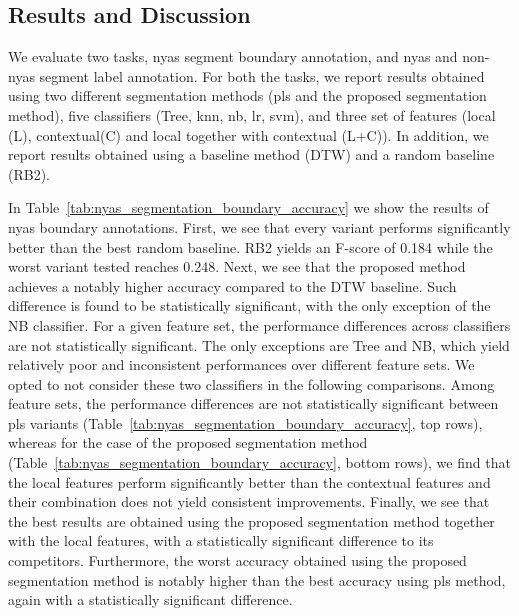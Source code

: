 {\subsection{Results and Discussion}
\label{sec:preprocessing_nyas_segmentation_results_and_discussion}

We evaluate two tasks, \gls{nyas} segment boundary annotation, and \gls{nyas} and non-\gls{nyas} segment label annotation. For both the tasks, we report results obtained using two different segmentation methods (\gls{pls} and the proposed segmentation method), five classifiers (Tree, \gls{knn}, \gls{nb}, \gls{lr}, \gls{svm}), and three set of features (local (L), contextual(C) and local together with contextual (L+C)). In addition, we report results obtained using a baseline method (DTW) and a random baseline (RB2).

In Table~\ref{tab:nyas_segmentation_boundary_accuracy} we show the results of \gls{nyas} boundary annotations. First, we see that every variant performs significantly better than the best random baseline. RB2 yields an F-score of 0.184 while the worst variant tested reaches 0.248. Next, we see that the proposed method achieves a notably higher accuracy compared to the DTW baseline. Such difference is found to be statistically significant, with the only exception of the NB classifier. For a given feature set, the performance differences across classifiers are not statistically significant. The only exceptions are Tree and NB, which yield relatively poor and inconsistent performances over different feature sets. We opted to not consider these two classifiers in the following comparisons. Among  feature sets, the performance differences are not statistically significant between \gls{pls} variants (Table~\ref{tab:nyas_segmentation_boundary_accuracy}, top rows), whereas for the case of the proposed segmentation method (Table~\ref{tab:nyas_segmentation_boundary_accuracy}, bottom rows), we find that the local features perform significantly better than the contextual features and their combination does not yield consistent improvements. Finally, we see that the best results are obtained using the proposed segmentation method together with the local features, with a statistically significant difference to its competitors. Furthermore, the worst accuracy obtained using the proposed segmentation method is notably higher than the best accuracy using \gls{pls} method, again with a statistically significant difference.

}
